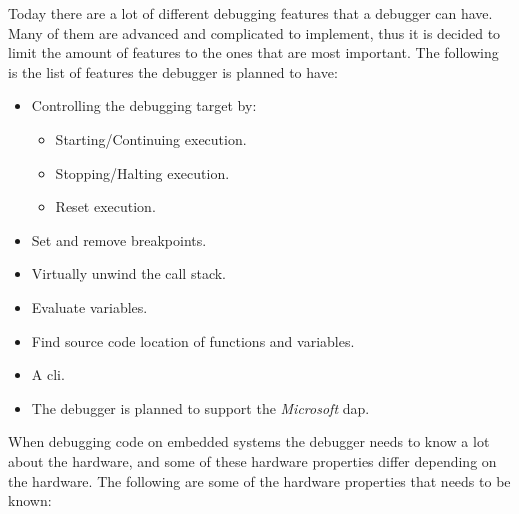 Today there are a lot of different debugging features that a debugger can have.
Many of them are advanced and complicated to implement, thus it is decided to limit the amount of features to the ones that are most important.
The following is the list of features the debugger is planned to have:

\begin{itemize} \label{list:debuggerfeatures}
  \item Controlling the debugging target by:
  \begin{itemize}
    \item Starting/Continuing execution.
    \item Stopping/Halting execution.
    \item Reset execution.
  \end{itemize}
  \item Set and remove breakpoints.
  \item Virtually unwind the call stack.
  \item Evaluate variables.
  \item Find source code location of functions and variables.
  \item A \acrfull{cli}.
  \item The debugger is planned to support the \emph{Microsoft} \acrfull{dap}.
\end{itemize}




When debugging code on embedded systems the debugger needs to know a lot about the hardware, and some of these hardware properties differ depending on the hardware.
The following are some of the hardware properties that needs to be known:

